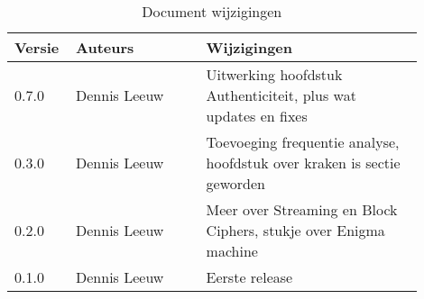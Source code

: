 \begin{flushleft}
\begin{table}[h!]
\centering
	\begin{tabularx}{\textwidth}{ |p{0.1\linewidth}|p{0.3\linewidth}|p{0.5\linewidth}| }
\hline
	Versie &
	Auteurs &
	Wijzigingen\\
\hline
	0.7.0 &
	Dennis Leeuw &
	Uitwerking hoofdstuk Authenticiteit, plus wat updates en fixes\\
\hline
	0.3.0 &
	Dennis Leeuw &
	Toevoeging frequentie analyse, hoofdstuk over kraken is sectie geworden\\
\hline
	0.2.0 &
	Dennis Leeuw &
	Meer over Streaming en Block Ciphers, stukje over Enigma machine\\
\hline
	0.1.0 &
	Dennis Leeuw &
	Eerste release\\
\hline
\hline
\end{tabularx}
\caption{Document wijzigingen}
\label{table:1}
\end{table}
\end{flushleft}

